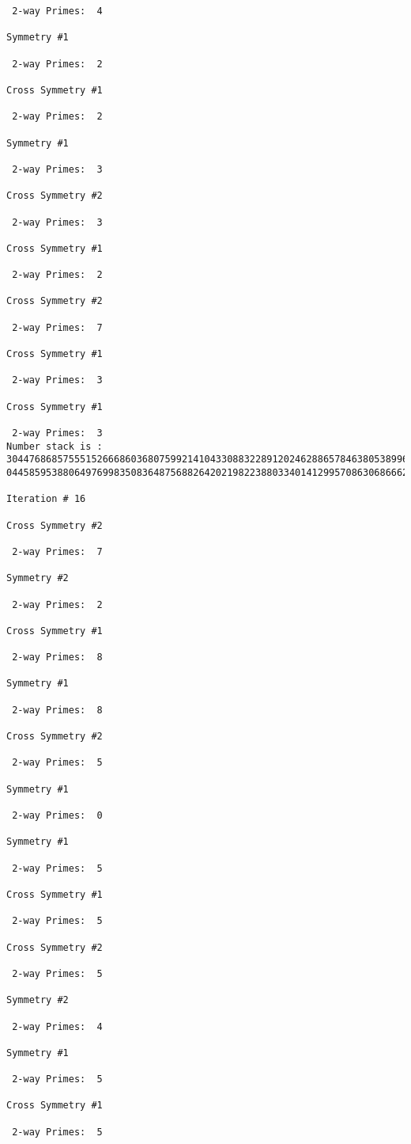 \begin{verbatim}
 2-way Primes: 	4

Symmetry #1

 2-way Primes: 	2

Cross Symmetry #1

 2-way Primes: 	2

Symmetry #1

 2-way Primes: 	3

Cross Symmetry #2

 2-way Primes: 	3

Cross Symmetry #1

 2-way Primes: 	2

Cross Symmetry #2

 2-way Primes: 	7

Cross Symmetry #1

 2-way Primes: 	3

Cross Symmetry #1

 2-way Primes: 	3
Number stack is :
30447686857555152666860368075992141043308832289120246288657846380538996794608835958544046240163340857
04458595388064976998350836487568826420219822388033401412995708630686662515557586867440375804336104264

Iteration #	16

Cross Symmetry #2

 2-way Primes: 	7

Symmetry #2

 2-way Primes: 	2

Cross Symmetry #1

 2-way Primes: 	8

Symmetry #1

 2-way Primes: 	8

Cross Symmetry #2

 2-way Primes: 	5

Symmetry #1

 2-way Primes: 	0

Symmetry #1

 2-way Primes: 	5

Cross Symmetry #1

 2-way Primes: 	5

Cross Symmetry #2

 2-way Primes: 	5

Symmetry #2

 2-way Primes: 	4

Symmetry #1

 2-way Primes: 	5

Cross Symmetry #1

 2-way Primes: 	5


\end{verbatim}
